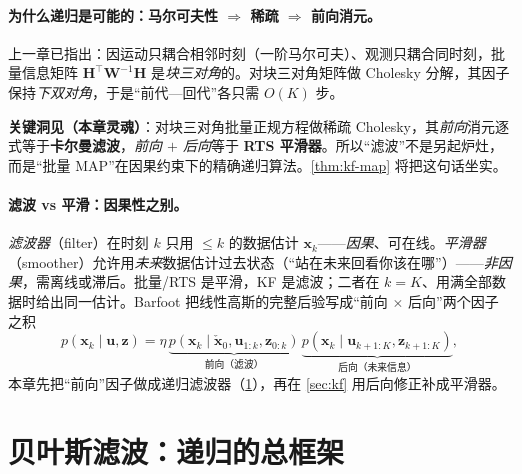 \paragraph{为什么递归是可能的：马尔可夫性 $\Rightarrow$ 稀疏 $\Rightarrow$ 前向消元。}
上一章已指出：因运动只耦合相邻时刻（一阶马尔可夫）、观测只耦合同时刻，批量信息矩阵 $\mathbf{H}^\top\mathbf{W}^{-1}\mathbf{H}$ 是\emph{块三对角}的。对块三对角矩阵做 Cholesky 分解，其因子保持\emph{下双对角}，于是“前代—回代”各只需 $O(K)$ 步\cite{barfoot2024state}。
\begin{insight}
\textbf{关键洞见（本章灵魂）}：对块三对角批量正规方程做稀疏 Cholesky，其\emph{前向}消元逐式等于\textbf{卡尔曼滤波}，\emph{前向 $+$ 后向}等于 \textbf{RTS 平滑器}。所以“滤波”不是另起炉灶，而是“批量 MAP”在因果约束下的精确递归算法。\cref{thm:kf-map} 将把这句话坐实。
\end{insight}

\paragraph{滤波 vs 平滑：因果性之别。}
\emph{滤波器}（filter）在时刻 $k$ 只用 $\le k$ 的数据估计 $\mathbf{x}_k$——\emph{因果}、可在线。\emph{平滑器}（smoother）允许用\emph{未来}数据估计过去状态（“站在未来回看你该在哪”）——\emph{非因果}，需离线或滞后。批量/RTS 是平滑，KF 是滤波；二者在 $k=K$、用满全部数据时给出同一估计。Barfoot\cite{barfoot2024state} 把线性高斯的完整后验写成“前向 $\times$ 后向”两个因子之积
\begin{equation}
  p(\mathbf{x}_k\mid\mathbf{u},\mathbf{z})=\eta\,
  \underbrace{p(\mathbf{x}_k\mid\check{\mathbf{x}}_0,\mathbf{u}_{1:k},\mathbf{z}_{0:k})}_{\text{前向（滤波）}}\,
  \underbrace{p(\mathbf{x}_k\mid\mathbf{u}_{k+1:K},\mathbf{z}_{k+1:K})}_{\text{后向（未来信息）}},
  \label{eq:eskf-fwd-bwd}
\end{equation}
本章先把“前向”因子做成递归滤波器（\cref{sec:bayes-filter}），再在 \cref{sec:kf} 用后向修正补成平滑器。

\section{贝叶斯滤波：递归的总框架}
\label{sec:bayes-filter}

